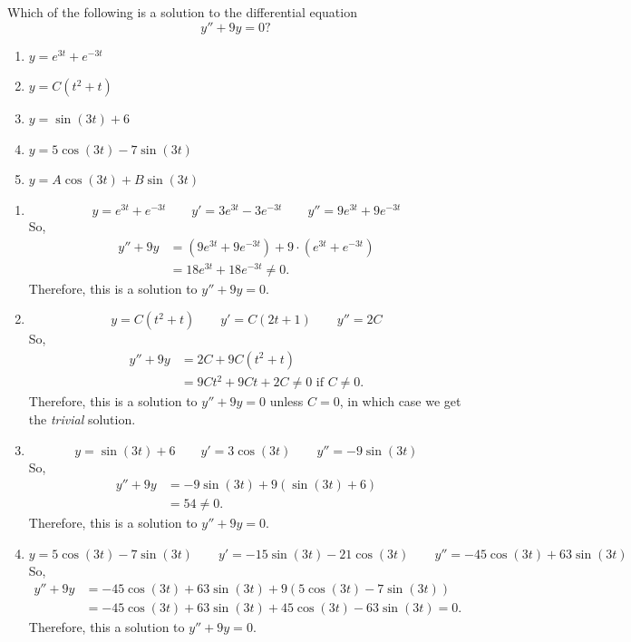 \documentclass[noinstructornotes]{ximera}
\begin{document}
\begin{problem}
Which of the following is a solution to the differential equation $$y'' + 9y = 0?$$
	\begin{enumerate}
	\item  $y=e^{3t}+e^{-3t}$
	\item  $y=C(t^2 + t)$
	\item  $y=\sin(3t) + 6$
	\item  $y=5 \cos(3t) - 7 \sin(3t)$
	\item  $y=A \cos(3t) + B \sin(3t)$ 
	\end{enumerate}
	
	\begin{freeResponse}
	\begin{enumerate}
	
	\item  \[ y = e^{3t}+e^{-3t} 	\qquad	y'=3e^{3t}-3e^{-3t} 	\qquad	y''=9e^{3t}+9e^{-3t} \]  
	So,
		\begin{align*}
		y''+9y &= (9e^{3t}+9e^{-3t}) + 9\cdot (e^{3t}+e^{-3t})  \\
		&= 18e^{3t} + 18e^{-3t} \neq 0.
		\end{align*}
	Therefore, this is  a solution to $y''+9y=0$.
	
	
	
	\item  \[ y = C(t^2+t) 	\qquad	y'=C(2t+1) 	\qquad	y''=2C \] 
	So,
		\begin{align*}
		y''+9y &= 2C + 9C(t^2+t)  \\
		&= 9Ct^2 + 9Ct + 2C \neq 0 \text{ if } C \neq 0.
		\end{align*}
	Therefore, this is  a solution to $y''+9y=0$ unless $C=0$, in which case we get the {\it trivial} solution.
	
	
	
	\item  \[ y = \sin(3t)+6 	\qquad	y'=3\cos(3t) 	\qquad	y''=-9\sin(3t) \]  
	So,
		\begin{align*}
		y''+9y 
		&= -9\sin(3t) +9(\sin(3t) + 6)  \\
		&= 54 \neq 0.
		\end{align*}
	Therefore, this is  a solution to $y''+9y=0$.
	
	
	
	\item  \[ y = 5\cos(3t)-7\sin(3t) 	\qquad	y'=-15\sin(3t)-21\cos(3t) 	\qquad	y''=-45\cos(3t)+63\sin(3t) \]  
	So,
		\begin{align*}
		y''+9y 
		&= -45\cos(3t)+63\sin(3t) +9(5\cos(3t)-7\sin(3t))  \\
		&= -45\cos(3t)+63\sin(3t) + 45\cos(3t) - 63\sin(3t) = 0.
		\end{align*}
	Therefore, this  a solution to $y''+9y=0$.
	

\end{enumerate}
\end{freeResponse}
\end{problem}
\end{document}
